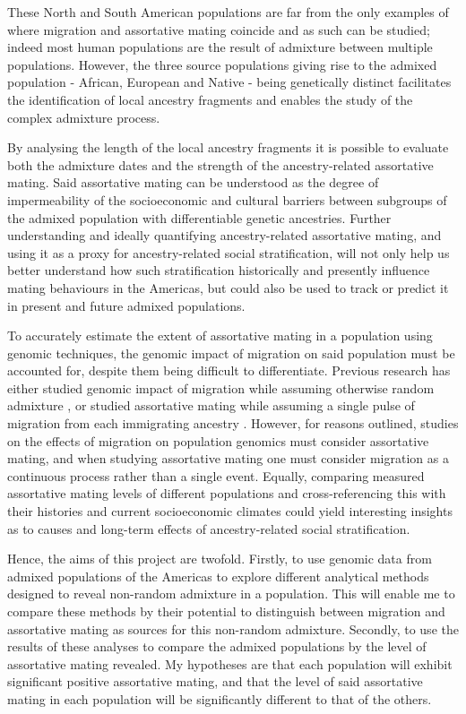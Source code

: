 \documentclass[11pt]{article}
\begin{document}
These North and South American populations are far from the only examples of where migration and assortative mating coincide and as such can be studied; indeed most human populations are the result of admixture between multiple populations. However, the three source populations giving rise to the admixed population - African, European and Native - being genetically distinct facilitates the identification of local ancestry fragments and enables the study of the complex admixture process.

By analysing the length of the local ancestry fragments it is possible to evaluate both the admixture dates and the strength of the ancestry-related assortative mating. Said assortative mating can be understood as the degree of impermeability of the socioeconomic and cultural barriers between subgroups of the admixed population with differentiable genetic ancestries. Further understanding and ideally quantifying ancestry-related assortative mating, and using it as a proxy for ancestry-related social stratification, will not only help us better understand how such stratification historically and presently influence mating behaviours in the Americas, but could also be used to track or predict it in present and future admixed populations. 

To accurately estimate the extent of assortative mating in a population using genomic techniques, the genomic impact of migration on said population must be accounted for, despite them being difficult to differentiate. Previous research has either studied genomic impact of migration while assuming otherwise random admixture \parencite{Norris2020,Borda2020,Gravel2012}, or studied assortative mating while assuming a single pulse of migration from each immigrating ancestry \parencite{Norris2019,Risch2009,Zaitlen2017}. However, for reasons outlined, studies on the effects of migration on population genomics must consider assortative mating, and when studying assortative mating one must consider migration as a continuous process rather than a single event. Equally, comparing measured assortative mating levels of different populations and cross-referencing this with their histories and current socioeconomic climates could yield interesting insights as to causes and long-term effects of ancestry-related social stratification. 

Hence, the aims of this project are twofold. Firstly, to use genomic data from admixed populations of the Americas to explore different analytical methods designed to reveal non-random admixture in a population. This will enable me to compare these methods by their potential to distinguish between migration and assortative mating as sources for this non-random admixture. Secondly, to use the results of these analyses to compare the admixed populations by the level of assortative mating revealed. My hypotheses are that each population will exhibit significant positive assortative mating, and that the level of said assortative mating in each population will be significantly different to that of the others.
\end{document}
